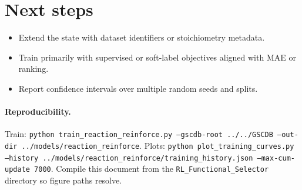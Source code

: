 \documentclass[11pt]{article}
\begin{document}
\section{Next steps}
\begin{itemize}
  \item Extend the state with dataset identifiers or stoichiometry metadata.
  \item Train primarily with supervised or soft-label objectives aligned with MAE or ranking.
  \item Report confidence intervals over multiple random seeds and splits.
\end{itemize}

\paragraph{Reproducibility.}
Train: \texttt{python train\_reaction\_reinforce.py --gscdb-root ../../GSCDB --out-dir ../models/reaction\_reinforce}. Plots: \texttt{python plot\_training\_curves.py --history ../models/reaction\_reinforce/training\_history.json --max-cum-update 7000}. Compile this document from the \texttt{RL\_Functional\_Selector} directory so figure paths resolve.
\end{document}
